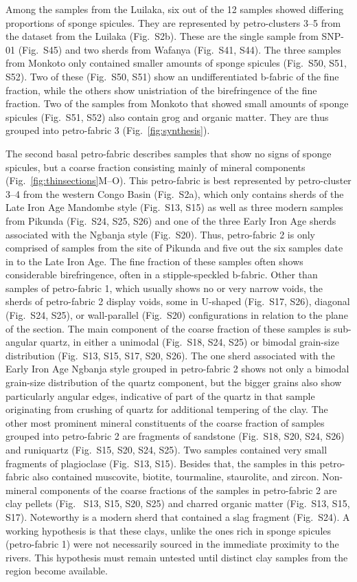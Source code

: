\documentclass[preprint,10pt,oneside,onecolumn,authoryear]{elsarticle}
\begin{document}
Among the samples from the Luilaka, six out of the 12 samples showed differing proportions of sponge spicules. They are represented by petro-clusters 3--5 from the dataset from the Luilaka (Fig.~S2b). These are the single sample from SNP-01 (Fig.~S45) and two sherds from Wafanya (Fig.~S41, S44). The three samples from Monkoto only contained smaller amounts of sponge spicules (Fig.~S50, S51, S52). Two of these (Fig.~S50, S51) show an undifferentiated b-fabric of the fine fraction, while the others show unistriation of the birefringence of the fine fraction. Two of the samples from Monkoto that showed small amounts of sponge spicules (Fig.~S51, S52) also contain grog and organic matter. They are thus grouped into petro-fabric 3 (Fig.~\ref{fig:synthesis}).

The second basal petro-fabric describes samples that show no signs of sponge spicules, but a coarse fraction consisting mainly of mineral components (Fig.~\ref{fig:thinsections}M--O). This petro-fabric is best represented by petro-cluster 3--4 from the western Congo Basin (Fig.~S2a), which only contains sherds of the Late Iron Age Mandombe style (Fig.~S13, S15) as well as three modern samples from Pikunda (Fig.~S24, S25, S26) and one of the three Early Iron Age sherds associated with the Ngbanja style (Fig.~S20). Thus, petro-fabric 2 is only comprised of samples from the site of Pikunda and five out the six samples date in to the Late Iron Age. The fine fraction of these samples often shows considerable birefringence, often in a stipple-speckled b-fabric. Other than samples of petro-fabric 1, which usually shows no or very narrow voids, the sherds of petro-fabric 2 display voids, some in U-shaped (Fig.~S17, S26), diagonal (Fig.~S24, S25), or wall-parallel (Fig.~S20) configurations in relation to the plane of the section. The main component of the coarse fraction of these samples is sub-angular quartz, in either a unimodal (Fig.~S18, S24, S25) or bimodal grain-size distribution (Fig.~S13, S15, S17, S20, S26). The one sherd associated with the Early Iron Age Ngbanja style grouped in petro-fabric 2 shows not only a bimodal grain-size distribution of the quartz component, but the bigger grains also show particularly angular edges, indicative of part of the quartz in that sample originating from crushing of quartz for additional tempering of the clay. The other most prominent mineral constituents of the coarse fraction of samples grouped into petro-fabric 2 are fragments of sandstone (Fig.~S18, S20, S24, S26) and runiquartz (Fig.~S15, S20, S24, S25). Two samples contained very small fragments of plagioclase (Fig.~S13, S15). Besides that, the samples in this petro-fabric also contained muscovite, biotite, tourmaline, staurolite, and zircon. Non-mineral components of the coarse fractions of the samples in petro-fabric 2 are clay pellets (Fig.~ S13, S15, S20, S25) and charred organic matter (Fig.~S13, S15, S17). Noteworthy is a modern sherd that contained a slag fragment (Fig.~S24). A working hypothesis is that these clays, unlike the ones rich in sponge spicules (petro-fabric 1) were not necessarily sourced in the immediate proximity to the rivers. This hypothesis must remain untested until distinct clay samples from the region become available.
\end{document}
